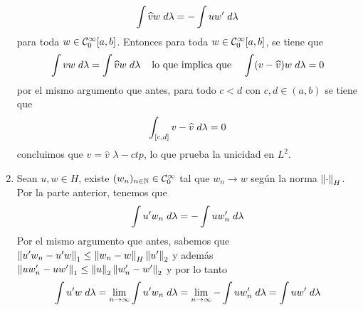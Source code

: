 \documentclass{article}
\begin{document}
\begin{enumerate}
\begin{equation*}
        \int \widehat{v}w\hspace{1mm}d\lambda=-\int uw'\hspace{1mm}d\lambda
    \end{equation*}
    para toda $w\in\mathcal{C}_{0}^{\infty}[a,b]$. Entonces para toda $w\in\mathcal{C}_{0}^{\infty}[a,b]$, se 
    tiene que
    \begin{equation*}
        \int vw\hspace{1mm}d\lambda=\int\widehat{v}w\hspace{1mm}d\lambda
        \hspace{4mm}\text{lo que implica que}\hspace{4mm}
        \int(v-\widehat{v})w\hspace{1mm}d\lambda=0
    \end{equation*}
    por el mismo argumento que antes, para todo $c<d$ con $c,d\in(a,b)$ se tiene que
    \begin{equation*}
        \int_{[c,d]}v-\widehat{v}\hspace{1mm}d\lambda=0
    \end{equation*}
    concluimos que $v=\widehat{v}$ $\lambda-ctp$, lo que prueba la unicidad en $L^{2}$.
    
    \item Sean $u,w\in H$, existe $(w_{n})_{n\in\mathbb{N}}\in\mathcal{C}_{0}^{\infty}$ tal que $w_{n}\to w$ según 
    la norma $\left \lVert \cdot\right \rVert_{H}$. Por la parte anterior, tenemos que
    \begin{equation*}
        \int u'w_{n}\hspace{1mm}d\lambda=-\int uw_{n}'\hspace{1mm}d\lambda
    \end{equation*}
    Por el mismo argumento que antes, sabemos que $\left \lVert u'w_{n}-u'w\right \rVert_{1}\leq\left \lVert w_{n}-w\right \rVert_{H}
    \left \lVert u'\right \rVert_{2}$ y además $\left \lVert uw_{n}'-uw'\right \rVert_{1}\leq\left \lVert u\right \rVert_{2}\left \lVert w_{n}'-w'\right \rVert_{2}$ y por lo 
    tanto
    \begin{equation*}
        \int u'w\hspace{1mm}d\lambda=\lim\limits_{n\to\infty}\int u'w_{n}\hspace{1mm}d\lambda
        =\lim\limits_{n\to\infty}-\int uw_{n}'\hspace{1mm}d\lambda=\int uw'\hspace{1mm}d\lambda
    \end{equation*}
    

\end{enumerate}
\end{document}

